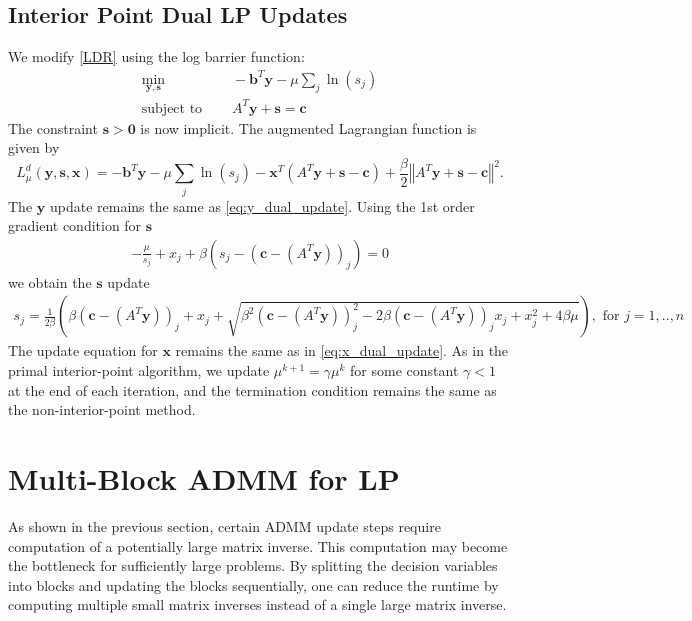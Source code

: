 \documentclass{article}
\begin{document}
\subsection*{Interior Point Dual LP Updates}
We modify \eqref{LDR} using the log barrier function:
\begin{align}
\min_{\mathbf{y}, \mathbf{s}} &\quad -\mathbf{b}^T\mathbf{y} - \mu \sum_j \ln (s_j)  \tag{LDRB}\label{LDRB} \\
\text{subject to } &\quad  A^T \mathbf{y}  + \mathbf{s} = \mathbf{c}  \nonumber
\end{align}
The constraint $\mathbf{s} > \mathbf{0}$ is now implicit. The augmented Lagrangian function is given by
\[
L_{\mu}^{d}(\mathbf{y},\mathbf{s},\mathbf{x})=-\mathbf{b}^{T}\mathbf{y}-\mu\sum_{j}\ln\left(s_{j}\right)-\mathbf{x}^{T}\left(A^{T}\mathbf{y}+\mathbf{s}-\mathbf{c}\right)+\frac{\beta}{2}\left\Vert A^{T}\mathbf{y}+\mathbf{s}-\mathbf{c}\right\Vert ^{2}.
\]
The $\mathbf{y}$ update remains the same as \eqref{eq:y_dual_update}. Using the 1st order gradient condition for $\mathbf{s}$
\begin{align}
- \frac{\mu}{s_j} + x_j  + \beta \left(s_j - (\mathbf{c} - (A^T \mathbf{y}))_j\right)= 0
\end{align}
we obtain the $\mathbf{s}$ update
\begin{align}
s_j = \frac{1}{2\beta}\left(\beta (\mathbf{c} - (A^T \mathbf{y}))_j + x_j  + \sqrt{\beta^2 (\mathbf{c} - (A^T \mathbf{y}))_j^2 - 2\beta (\mathbf{c} - (A^T \mathbf{y}))_j x_{j} + x_j^2 + 4\beta\mu } \right), \text{ for $j = 1,..,n$}
\end{align}
The update equation for $\mathbf{x}$ remains the same as in \eqref{eq:x_dual_update}. As in the primal interior-point algorithm, we update $\mu^{k+1} = \gamma \mu^k$ for some constant $\gamma<1$ at the end of each iteration, and the termination condition remains the same as the non-interior-point method.

\section{Multi-Block ADMM for LP}

As shown in the previous section, certain ADMM update steps require computation of a potentially large matrix inverse. This computation may become the bottleneck for sufficiently large problems. By splitting the decision variables into blocks and updating the blocks sequentially, one can reduce the runtime by computing multiple small matrix inverses instead of a single large matrix inverse.
\end{document}
